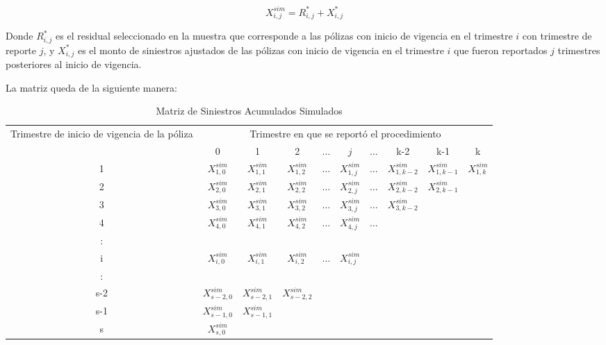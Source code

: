 \documentclass[11pt,twoside,openright,spanish]{report}
\numberwithin{equation}{chapter}
\numberwithin{figure}{chapter}
\numberwithin{table}{chapter}
\begin{document}
	\begin{equation}
    X_{i,j}^{sim}=R_{i,j}^{*}+X_{i,j}^{*} 
\label{eq8}    
\end{equation}
	
	Donde $R_{i,j}^{*}$ es el residual seleccionado en la muestra que corresponde a las pólizas con inicio de vigencia en el trimestre $i$ con trimestre de reporte $j$, y $X_{i,j}^{*}$ es el monto de siniestros ajustados de las pólizas con inicio de vigencia en el trimestre $i$ que fueron reportados $j$ trimestres posteriores al inicio de vigencia.
	
	La matriz queda de la siguiente manera:
	
	\begin{table}[H]
		\centering
		\caption{Matriz de Siniestros Acumulados Simulados}
		\begin{tabularx}{\linewidth}{ c|ccccccccc}
			\multirow{2}{4cm}{Trimestre de inicio de vigencia de la póliza}& \multicolumn{9}{c}{Trimestre en que se reportó el procedimiento} \\
			& 0  & 1 & 2 & $ \dots $ & $j$ & $\dots $ & k-2 & k-1 &  k \\
			\midrule
			1      &  $X_{1,0}^{sim}$ & $X_{1,1}^{sim}$ & $X_{1,2}^{sim}$ & $ \dots $ & $X_{1,j}^{sim}$ & $ \dots $ & $X_{1,k-2}^{sim}$ & $X_{1,k-1}^{sim}$ & $X_{1,k}^{sim}$ \\
			2      &  $X_{2,0}^{sim}$ & $X_{2,1}^{sim}$ & $X_{2,2}^{sim}$ & $ \dots $ & $X_{2,j}^{sim}$ & $ \dots $ & $X_{2,k-2}^{sim}$ & $X_{2,k-1}^{sim}$ & \\
			3      &  $X_{3,0}^{sim}$ & $X_{3,1}^{sim}$ & $X_{3,2}^{sim}$ & $ \dots $ & $X_{3,j}^{sim}$ & $ \dots $ & $X_{3,k-2}^{sim}$ & & \\
			4      &  $X_{4,0}^{sim}$ & $X_{4,1}^{sim}$ & $X_{4,2}^{sim}$ & $ \dots $ & $X_{4,j}^{sim}$ & $ \dots $ & & & \\
			:      & & & & & & & & &\\
			i      &  $X_{i,0}^{sim}$ & $X_{i,1}^{sim}$ & $X_{i,2}^{sim}$ & $ \dots $ & $X_{i,j}^{sim}$ & & & & \\
			:      & & & & & & & & & \\
			s-2      &  $X_{s-2,0}^{sim}$ & $X_{s-2,1}^{sim}$ & $X_{s-2,2}^{sim}$ & & & & & & \\
			s-1      &  $X_{s-1,0}^{sim}$ & $X_{s-1,1}^{sim}$ & & & & & & & \\
			s      &  $X_{s,0}^{sim}$ & & & & & & & & \\
		\end{tabularx}
	\end{table}
\end{document}
